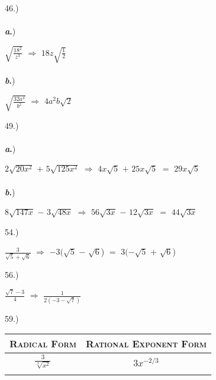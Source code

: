 \documentclass[12pt]{article}
\begin{document}
{\setlength{\parindent}{0cm}
46.) 
    \paragraph{} \textbf{\textit{a}.})
        \begin{center} $\sqrt{\frac{18^2}{z^3}}$ $\Longrightarrow$ $18z\sqrt{\frac{1}{2}}$ \end{center} 
    \paragraph{} \textbf{\textit{b}.})
        \begin{center} $\sqrt{\frac{32a^4}{b^2}}$ $\Longrightarrow$ $4a^2b\sqrt{2}$ \end{center} 
}
{\setlength{\parindent}{0cm}
49.) 
    \paragraph{} \textbf{\textit{a}.})
        \begin{center} $2\sqrt{20x^2}$ $+$ $5\sqrt{125x^2}$ $\Longrightarrow$ $4x\sqrt{5}$ $+$ $25x\sqrt{5}$ $=$ $29x\sqrt{5}$ \end{center} 
    \paragraph{} \textbf{\textit{b}.})
        \begin{center} $8\sqrt{147x}$ $-$ $3\sqrt{48x}$ $\Longrightarrow$ $56\sqrt{3x}$ $-$ $12\sqrt{3x}$ $=$ $44\sqrt{3x}$ \end{center} 
}
{\setlength{\parindent}{0cm}
54.) 
    \begin{center} $\frac{3}{\sqrt{5}+\sqrt{6}}$ $\Longrightarrow$ $-3(\sqrt{5}$ $-$ $\sqrt{6}$) $=$ $3(-\sqrt{5}$ $+$ $\sqrt{6}$) \end{center}
}
{\setlength{\parindent}{0cm}
56.) 
    \begin{center} $\frac{\sqrt{7}-3}{4}$ $\Longrightarrow$ $\frac{1}{2(-3-\sqrt{7})}$ \end{center}
}
{\setlength{\parindent}{0cm}
59.) 
    \begin{center}
        \begin{tabular}{| c | c |}
    	    \hline
    	    \textsc{Radical Form} & \textsc{Rational Exponent Form} 
        	\\ \hline
            $\frac{3}{\sqrt[3]{x^2}}$ & $3x^{-2/3}$ \\
            \\ \hline
        \end{tabular}
    \end{center}
}
\end{document}
